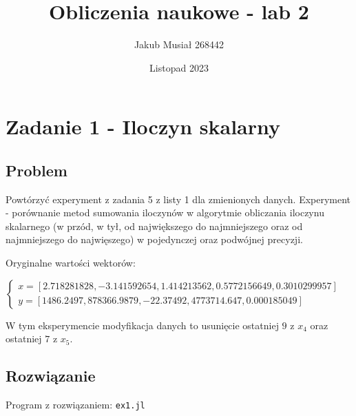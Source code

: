 \documentclass[12pt]{article}
\title{Obliczenia naukowe - lab 2}
\author{Jakub Musiał 268442}
\date{Listopad 2023}
\begin{document}
\maketitle

\hspace{1cm}

\section*{Zadanie 1 - Iloczyn skalarny}
    \subsection*{Problem}
        Powtórzyć experyment z zadania 5 z listy 1 dla zmienionych danych.
        \newline
        Experyment - porównanie metod sumowania iloczynów w algorytmie obliczania iloczynu skalarnego (w przód, w tył, od największego do najmniejszego oraz od najmniejszego do najwięszego) w pojedynczej oraz podwójnej precyzji.
        \newline

        \noindent Oryginalne wartości wektorów:
            \begin{center}
            \begin{math}
                \left\{
                    \begin{array}{l}
                        x = [2.718281828, -3.141592654, 1.414213562, 0.5772156649, 0.3010299957] \\
                        y = [1486.2497, 878366.9879, -22.37492, 4773714.647, 0.000185049]
                    \end{array}
                \right.
            \end{math}
            \end{center}

        \noindent \newline
        W tym eksperymencie modyfikacja danych to usunięcie ostatniej $9$ z $x_4$ oraz ostatniej $7$ z $x_5$.
        \newline

    \subsection*{Rozwiązanie}
        Program z rozwiązaniem: \texttt{ex1.jl}
        \newline
\end{document}
